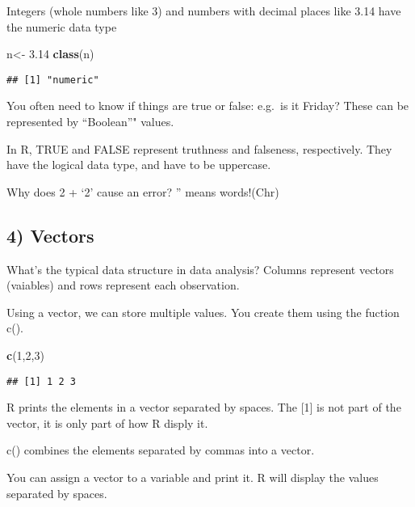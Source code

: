 \documentclass[
]{article}
\newenvironment{Shaded}{\begin{snugshade}}{\end{snugshade}}
\newcommand{\DecValTok}[1]{\textcolor[rgb]{0.00,0.00,0.81}{#1}}
\newcommand{\FloatTok}[1]{\textcolor[rgb]{0.00,0.00,0.81}{#1}}
\newcommand{\KeywordTok}[1]{\textcolor[rgb]{0.13,0.29,0.53}{\textbf{#1}}}
\newcommand{\NormalTok}[1]{#1}
\newcommand{\StringTok}[1]{\textcolor[rgb]{0.31,0.60,0.02}{#1}}
\begin{document}
Integers (whole numbers like 3) and numbers with decimal places like
3.14 have the numeric data type

\begin{Shaded}
\begin{Highlighting}[]
\NormalTok{ n<-}\StringTok{ }\FloatTok{3.14}
 \KeywordTok{class}\NormalTok{(n)}
\end{Highlighting}
\end{Shaded}

\begin{verbatim}
## [1] "numeric"
\end{verbatim}

You often need to know if things are true or false: e.g.~is it Friday?
These can be represented by ``Boolean''" values.

In R, TRUE and FALSE represent truthness and falseness, respectively.
They have the logical data type, and have to be uppercase.

Why does 2 + `2' cause an error? '' means words!(Chr)

\hypertarget{vectors}{%
\subsection{4) Vectors}\label{vectors}}

What's the typical data structure in data analysis? Columns represent
vectors (vaiables) and rows represent each observation.

Using a vector, we can store multiple values. You create them using the
fuction c().

\begin{Shaded}
\begin{Highlighting}[]
\KeywordTok{c}\NormalTok{(}\DecValTok{1}\NormalTok{,}\DecValTok{2}\NormalTok{,}\DecValTok{3}\NormalTok{)}
\end{Highlighting}
\end{Shaded}

\begin{verbatim}
## [1] 1 2 3
\end{verbatim}

R prints the elements in a vector separated by spaces. The {[}1{]} is
not part of the vector, it is only part of how R disply it.

c() combines the elements separated by commas into a vector.

You can assign a vector to a variable and print it. R will display the
values separated by spaces.
\end{document}
